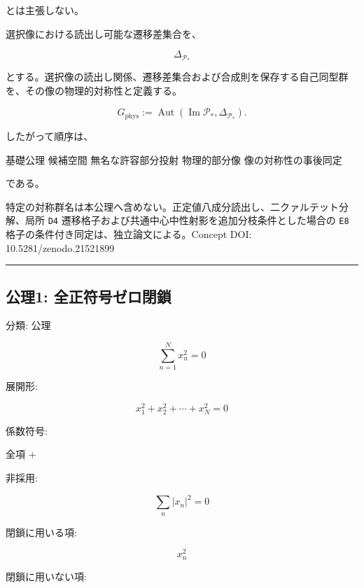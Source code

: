 \documentclass[
  a4paper,
]{ltjsarticle}
\newenvironment{Shaded}{}{}
\newcommand{\NormalTok}[1]{#1}
\begin{document}
とは主張しない。

選択像における読出し可能な遷移差集合を、

\[
\Delta_{\mathcal P_*}
\]

とする。選択像の読出し関係、遷移差集合および合成則を保存する自己同型群を、その像の物理的対称性と定義する。

\[
G_{\mathrm{phys}}
:=
\operatorname{Aut}
\left(
\operatorname{Im}\mathcal P_*,
\Delta_{\mathcal P_*}
\right).
\]

したがって順序は、

\begin{Shaded}
\begin{Highlighting}[]
\NormalTok{基礎公理}
\NormalTok{候補空間}
\NormalTok{無名な許容部分投射}
\NormalTok{物理的部分像}
\NormalTok{像の対称性の事後同定}
\end{Highlighting}
\end{Shaded}

である。

特定の対称群名は本公理へ含めない。正定値八成分読出し、二クァルテット分解、局所
\texttt{D4} 遷移格子および共通中心中性射影を追加分枝条件とした場合の
\texttt{E8} 格子の条件付き同定は、独立論文による。Concept DOI:
10.5281/zenodo.21521899

\begin{center}\rule{0.5\linewidth}{0.5pt}\end{center}

\subsection{公理1:
全正符号ゼロ閉鎖}\label{ux516cux74061-ux5168ux6b63ux7b26ux53f7ux30bcux30edux9589ux9396}

分類: 公理

\[
\sum_{n=1}^{N}x_n^2=0
\]

展開形:

\[
x_1^2+x_2^2+\cdots+x_N^2=0
\]

係数符号:

\begin{Shaded}
\begin{Highlighting}[]
\NormalTok{全項 +}
\end{Highlighting}
\end{Shaded}

非採用:

\[
\sum_n |x_n|^2=0
\]

閉鎖に用いる項:

\[
x_n^2
\]

閉鎖に用いない項:
\end{document}
